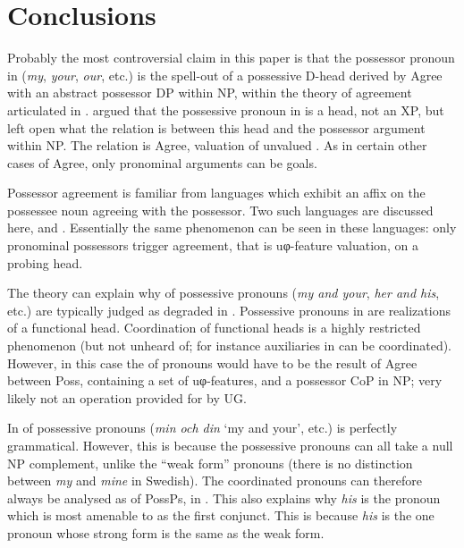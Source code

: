 \documentclass[output=paper]{langsci/langscibook}
\begin{document}
\section{Conclusions}\label{sec:key:16.4}

Probably the most controversial claim in this paper is that the possessor
pronoun in  (\emph{my}, \emph{your}, \emph{our}, etc.) is the spell-out
of a possessive D-head derived by Agree with an abstract possessor DP within
NP, within the theory of agreement articulated in
\textcite{Roberts2010,Roberts2010b}.  \citet{Delsing1998} argued that the
possessive pronoun in  is a head, not an XP, but left open what the
relation is between this head and the possessor argument within NP. The
relation is Agree, valuation of unvalued . As in certain other cases
of Agree, only pronominal arguments can be goals.

Possessor agreement is familiar from languages which exhibit an affix on the
possessee noun agreeing with the possessor. Two such languages are discussed
here,  and . Essentially the same phenomenon can be seen in
these languages: only pronominal possessors trigger agreement, that is
uφ-feature valuation, on a probing head.

The theory can explain why  of possessive pronouns (\emph{my and
your}, \emph{her and his}, etc.) are typically judged as degraded in .
Possessive pronouns in  are realizations of a functional head.
Coordination of functional heads is a highly restricted phenomenon (but not
unheard of; for instance auxiliaries in  can be coordinated). However,
in this case the  of pronouns would have to be the result of Agree
between Poss, containing a set of uφ-features, and a possessor CoP in NP; very
likely not an operation provided for by UG.

In   of possessive pronouns (\emph{min och din} `my and
your', etc.) is perfectly grammatical. However, this is because the 
possessive pronouns can all take a null NP complement, unlike the 
\enquote{weak form} pronouns (there is no distinction between \emph{my} and
\emph{mine} in Swedish). The coordinated pronouns can therefore always be
analysed as  of PossPs, in . This also explains why
\emph{his} is the  pronoun which is most amenable to  as the
first conjunct.  This is because \emph{his} is the one pronoun whose strong
form is the same as the weak form.
\end{document}
